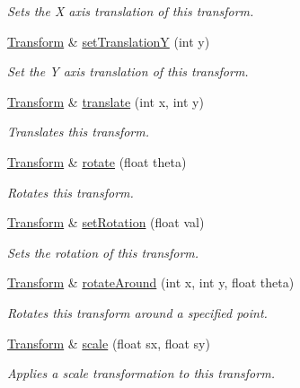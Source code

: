 \begin{DoxyCompactItemize}
\begin{DoxyCompactList}\small\item\em Sets the X axis translation of this transform. \end{DoxyCompactList}\item 
\hyperlink{classcturtle_1_1Transform}{Transform} \& \hyperlink{classcturtle_1_1Transform_a6e861207764b8ca62152b99eb86a1f1a}{set\+TranslationY} (int y)
\begin{DoxyCompactList}\small\item\em Set the Y axis translation of this transform. \end{DoxyCompactList}\item 
\hyperlink{classcturtle_1_1Transform}{Transform} \& \hyperlink{classcturtle_1_1Transform_ae5029e23d426ff809a48ab56316dd989}{translate} (int x, int y)
\begin{DoxyCompactList}\small\item\em Translates this transform. \end{DoxyCompactList}\item 
\hyperlink{classcturtle_1_1Transform}{Transform} \& \hyperlink{classcturtle_1_1Transform_a0f94d37257362afb874f5df8a127613a}{rotate} (float theta)
\begin{DoxyCompactList}\small\item\em Rotates this transform. \end{DoxyCompactList}\item 
\hyperlink{classcturtle_1_1Transform}{Transform} \& \hyperlink{classcturtle_1_1Transform_aafed415c37989dcc34ed5cadd7366487}{set\+Rotation} (float val)
\begin{DoxyCompactList}\small\item\em Sets the rotation of this transform. \end{DoxyCompactList}\item 
\hyperlink{classcturtle_1_1Transform}{Transform} \& \hyperlink{classcturtle_1_1Transform_a985c6b26564267172e0f3d8ced7868e0}{rotate\+Around} (int x, int y, float theta)
\begin{DoxyCompactList}\small\item\em Rotates this transform around a specified point. \end{DoxyCompactList}\item 
\hyperlink{classcturtle_1_1Transform}{Transform} \& \hyperlink{classcturtle_1_1Transform_a460e371e701eed2d19c14c6e93725c82}{scale} (float sx, float sy)
\begin{DoxyCompactList}\small\item\em Applies a scale transformation to this transform. \end{DoxyCompactList}\item 

\end{DoxyCompactItemize}
